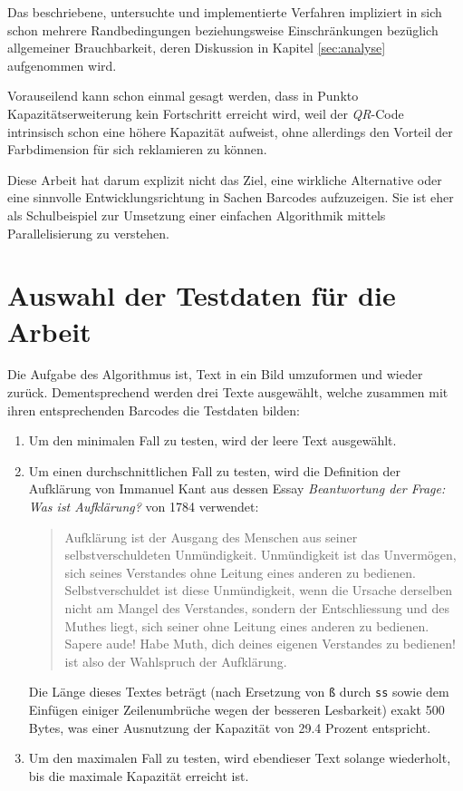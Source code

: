 \documentclass[11pt]{scrreprt} %
\theoremstyle{definition}
\begin{document}
Das beschriebene, untersuchte und implementierte Verfahren \cite{paper} impliziert in sich schon mehrere Randbedingungen beziehungsweise Einschränkungen bezüglich allgemeiner Brauchbarkeit, deren Diskussion in Kapitel \ref{sec:analyse} aufgenommen wird.

Vorauseilend kann schon einmal gesagt werden, dass in Punkto Kapazitätserweiterung kein Fortschritt erreicht wird, weil der {\it QR}-Code intrinsisch schon eine höhere Kapazität aufweist, ohne allerdings den Vorteil der Farbdimension für sich reklamieren zu können.

Diese Arbeit hat darum explizit nicht das Ziel, eine wirkliche Alternative oder eine sinnvolle Entwicklungsrichtung in Sachen Barcodes aufzuzeigen. Sie ist eher als Schulbeispiel zur Umsetzung einer einfachen Algorithmik mittels Parallelisierung zu verstehen.

\chapter{Auswahl der Testdaten für die Arbeit}

Die Aufgabe des Algorithmus ist, Text in ein Bild umzuformen und wieder zurück. Dementsprechend werden drei Texte ausgewählt, welche zusammen mit ihren entsprechenden Barcodes die Testdaten bilden:

\begin{enumerate}
\item Um den minimalen Fall zu testen, wird der leere Text ausgewählt.
\item Um einen durchschnittlichen Fall zu testen, wird die Definition der Aufklärung von Immanuel Kant aus dessen Essay {\it Beantwortung der Frage: Was ist Aufklärung?} von 1784 \cite{kant} verwendet:

\begin{quote}
Aufklärung ist der Ausgang des Menschen aus seiner selbstverschuldeten Unmündigkeit. Unmündigkeit ist das Unvermögen, sich seines Verstandes ohne Leitung eines anderen zu bedienen. Selbstverschuldet ist diese Unmündigkeit, wenn die Ursache derselben nicht am Mangel des Verstandes, sondern der Entschliessung und des Muthes liegt, sich seiner ohne Leitung eines anderen zu bedienen. Sapere aude! Habe Muth, dich deines eigenen Verstandes zu bedienen! ist also der Wahlspruch der Aufklärung. \cite{wiki:kant}

\end{quote}
Die Länge dieses Textes beträgt (nach Ersetzung von {\tt ß} durch {\tt ss} sowie dem Einfügen einiger Zeilenumbrüche wegen der besseren Lesbarkeit) exakt 500 Bytes, was einer Ausnutzung der Kapazität von 29.4 Prozent entspricht.

\item Um den maximalen Fall zu testen, wird ebendieser Text solange wiederholt, bis die maximale Kapazität erreicht ist.

\end{enumerate}
\end{document}
